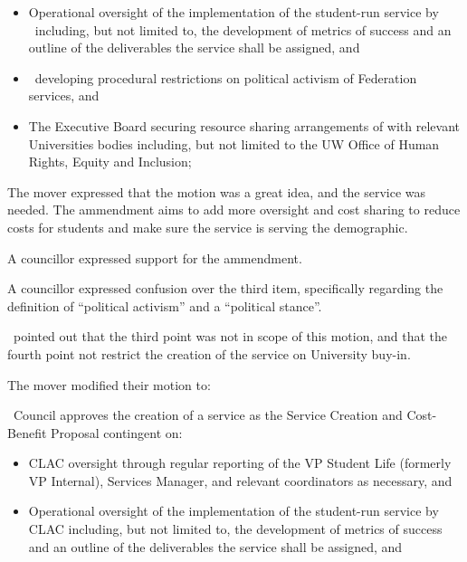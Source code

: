 \begin{motion}
\begin{motion}
\begin{itemize}
            \item Operational oversight of the implementation of the
                student-run service by \clac\ including, but not limited to,
                the development of metrics of success and an outline of the
                deliverables the service shall be assigned, and

            \item \clac\ developing procedural restrictions on political
                activism of Federation services, and

            \item The Executive Board securing resource sharing
                arrangements of with relevant Universities bodies
                including, but not limited to the UW Office of Human
                Rights, Equity and Inclusion;
        \end{itemize}
        \movers{\seneca}{\alexander}

        The mover expressed that the motion was a great idea, and the service
        was needed. The ammendment aims to add more oversight and cost sharing
        to reduce costs for students and make sure the service is serving the
        demographic.

        A councillor expressed support for the ammendment.

        A councillor expressed confusion over the third item, specifically 
        regarding the definition of ``political activism'' and a ``political
        stance''.

        \katie\ pointed out that the third point was not in scope of this
        motion, and that the fourth point not restrict the creation of the
        service on University buy-in.

        The mover modified their motion to:

        \begin{motion}
            \birt\ Council approves the creation of a service as the Service Creation
            and Cost-Benefit Proposal contingent on:

            \begin{itemize}
                \item CLAC oversight through regular reporting of the VP Student
                    Life (formerly VP Internal), Services Manager, and relevant
                    coordinators as necessary, and 

                \item Operational oversight of the implementation of the
                    student-run service by CLAC including, but not limited to, the
                    development of metrics of success and an outline of the
                    deliverables the service shall be assigned, and


\end{itemize}
\end{motion}
\end{motion}
\end{motion}
